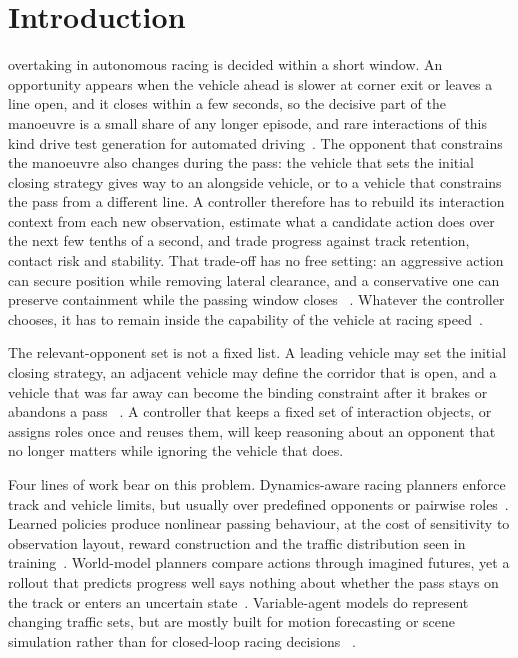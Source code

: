 \documentclass[journal]{IEEEtran}
\begin{document}
\section{Introduction}

 overtaking in autonomous racing is decided within a
short window. An opportunity appears when the vehicle ahead is slower at corner exit
or leaves a line open, and it closes within a few seconds, so the decisive part of
the manoeuvre is a small share of any longer episode, and rare interactions of
this kind drive test generation for automated
driving~\cite{feng2021intelligenttest,liu2024rarity}. The opponent that
constrains the manoeuvre also changes during the pass: the vehicle that sets the
initial closing strategy gives way to an alongside vehicle, or to a vehicle that
constrains the pass from a different line. A controller therefore has to rebuild its interaction
context from each new observation, estimate what a candidate action does over
the next few tenths of a second, and trade progress against track retention,
contact risk and stability. That trade-off has no free setting: an aggressive
action can secure position while removing lateral clearance, and a conservative
one can preserve containment while the passing window closes
~\cite{raji2022multivehicle,wischnewski2023tube}. Whatever the controller
chooses, it has to remain inside the capability of the vehicle at racing
speed~\cite{betz2022autonomous,wischnewski2022iac,cheng2024chassis_trajectory,cheng2025hybrid_dynamic}.

The relevant-opponent set is not a fixed list. A leading vehicle may set the
initial closing strategy, an adjacent vehicle may define the corridor that is
open, and a vehicle that was far away can become the binding
constraint after it brakes or abandons a pass
~\cite{huang2023gameformer,sun2022intersim}. A controller that keeps a fixed
set of interaction objects, or assigns roles once and reuses them, will keep
reasoning about an opponent that no longer matters while ignoring the vehicle
that does.

Four lines of work bear on this problem. Dynamics-aware racing planners enforce
track and vehicle limits, but usually over predefined opponents or pairwise
roles~\cite{betz2023tum,jung2023kaist}. Learned policies produce nonlinear
passing behaviour, at the cost of sensitivity to observation layout, reward
construction and the traffic distribution seen in
training~\cite{wurman2022granturismo,kiran2021drlsurvey,yurtsever2020survey,
wu2022fuzzyovertaking}. World-model planners compare actions through imagined
futures, yet a rollout that predicts progress well says nothing about whether
the pass stays on the track or enters an uncertain
state~\cite{schwarting2021dlc,hafner2023dreamerv3}. Variable-agent models do
represent changing traffic sets, but are mostly built for motion forecasting or
scene simulation rather than for closed-loop racing decisions
~\cite{ngiam2021scene,shi2022mtr,zhou2023qcnet}.
\end{document}
